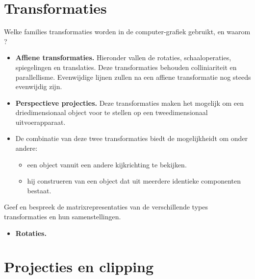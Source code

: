 \documentclass{report}
\begin{document}
\section{Transformaties}
\begin{enumerate}
	\vraag
	{
		Welke families transformaties worden in de computer-grafiek gebruikt, en waarom ?
	}
	{
		\begin{itemize}
			\item \textbf{Affiene transformaties.} Hieronder vallen de rotaties, schaaloperaties, spiegelingen en translaties. Deze transformaties behouden colliniariteit en parallellisme. Evenwijdige lijnen zullen na een affiene transformatie nog steeds evenwijdig zijn. 
			      			
			\item \textbf{Perspectieve projecties.} Deze transformaties maken het mogelijk om een driedimensionaal object voor te stellen op een tweedimensionaal uitvoerapparaat.
			      			
			\item De combinatie van deze twee transformaties biedt de mogelijkheidt om onder andere:
			      \begin{itemize}
			      	\item een object vanuit een andere kijkrichting te bekijken.
			      	\item hij construeren van een object dat uit meerdere identieke componenten bestaat. 
			      \end{itemize}
		\end{itemize}	
	}
		
	\vraag 
	{
		Geef en bespreek de matrixrepresentaties van de verschillende types transformaties en hun samenstellingen. 	
	}
	{
		\begin{itemize}
			\item \textbf{Rotaties.} 
		\end{itemize}
	}
\end{enumerate}

\section{Projecties en clipping}
\end{document}
